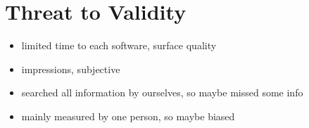\chapter{Threat to Validity}
\label{ch_validity}

\begin{itemize}
\item limited time to each software, surface quality
\item impressions, subjective
\item searched all information by ourselves, so maybe missed some info
\item mainly measured by one person, so maybe biased
\end{itemize}